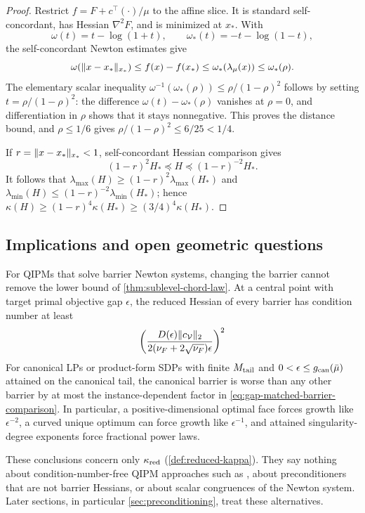 \begin{proof}
Restrict $f=F+c^\top(\cdot)/\mu$ to the affine slice.  It is standard
self-concordant, has Hessian $\nabla^2F$, and is minimized at $x_*$.  With
\[
 \omega(t)=t-\log(1+t),\qquad
 \omega_*(t)=-t-\log(1-t),
\]
the self-concordant Newton estimates give
\[
 \omega(\lVert x-x_*\rVert_{x_*})
 \leq f(x)-f(x_*)
 \leq\omega_*(\lambda_\mu(x))
 \leq\omega_*(\rho).
\]
The elementary scalar inequality
$\omega^{-1}(\omega_*(\rho))\leq\rho/(1-\rho)^2$ follows by setting
$t=\rho/(1-\rho)^2$: the difference $\omega(t)-\omega_*(\rho)$ vanishes at
$\rho=0$, and differentiation in $\rho$ shows that it stays nonnegative.  This proves the
distance bound, and $\rho\leq1/6$ gives
$\rho/(1-\rho)^2\leq6/25<1/4$.

If $r=\lVert x-x_*\rVert_{x_*}<1$, self-concordant Hessian comparison gives
\[
 (1-r)^2H_*\preceq H\preceq(1-r)^{-2}H_*.
\]
It follows that
$\lambda_{\max}(H)\geq(1-r)^2\lambda_{\max}(H_*)$ and
$\lambda_{\min}(H)\leq(1-r)^{-2}\lambda_{\min}(H_*)$; hence
$\kappa(H)\geq(1-r)^4\kappa(H_*)\geq(3/4)^4\kappa(H_*)$.
\end{proof}

\subsection{Implications and open geometric questions}
\label{sec:conditioning-implications}

For QIPMs that solve barrier Newton systems, changing the barrier cannot
remove the lower bound of \cref{thm:sublevel-chord-law}.  At a central point
with target primal objective gap $\epsilon$, the reduced Hessian of every
barrier has condition number at least
\[
 \left(
  \frac{D(\epsilon)\lVert c_{\mathcal V}\rVert_2}
       {2(\nu_F+2\sqrt{\nu_F})\epsilon}
 \right)^2
\]
For canonical LPs or product-form SDPs with finite $M_{\rm tail}$ and
$0<\epsilon\leq g_{\rm can}(\bar\mu)$ attained on the canonical tail, the
canonical barrier is worse than any other barrier by at most the
instance-dependent factor in \eqref{eq:gap-matched-barrier-comparison}.  In
particular, a positive-dimensional optimal face forces growth like
$\epsilon^{-2}$, a curved unique optimum can force growth like
$\epsilon^{-1}$, and attained singularity-degree exponents force fractional
power laws.

These conclusions concern only $\kappa_{\rm red}$
(\cref{def:reduced-kappa}).  They say nothing about condition-number-free
QIPM approaches such as
\citet{apers2026-quantum-speedups-linear-programming-interior}, about
preconditioners that are not barrier Hessians, or about scalar congruences
of the Newton system.  Later sections, in particular
\cref{sec:preconditioning}, treat these alternatives.

